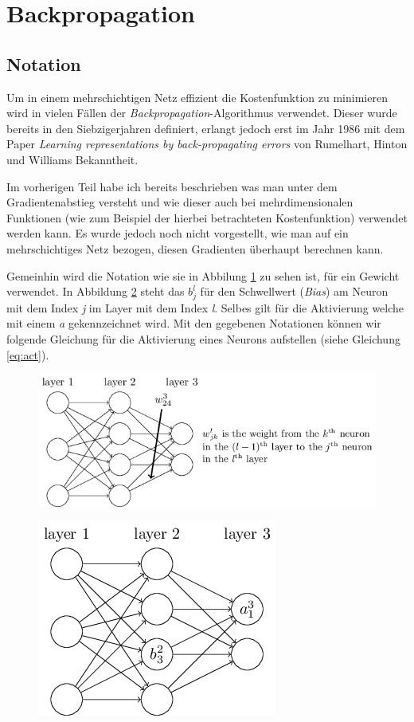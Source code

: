 \section{Backpropagation}

\subsection{Notation}

Um in einem mehrschichtigen Netz effizient die Kostenfunktion zu minimieren wird in vielen Fällen der \emph{Backpropagation}-Algorithmus verwendet. Dieser wurde bereits in den Siebzigerjahren definiert, erlangt jedoch erst im Jahr 1986 mit dem Paper \emph{Learning representations by back-propagating errors} von Rumelhart, Hinton und Williams Bekanntheit. 

Im vorherigen Teil habe ich bereits beschrieben was man unter dem Gradientenabstieg versteht und wie dieser auch bei mehrdimensionalen Funktionen (wie zum Beispiel der hierbei betrachteten Kostenfunktion) verwendet werden kann. Es wurde jedoch noch nicht vorgestellt, wie man auf ein mehrschichtiges Netz bezogen, diesen Gradienten überhaupt berechnen kann. 

Gemeinhin wird die Notation wie sie in Abbilung \ref{fig:weight_not} zu sehen ist, für ein Gewicht verwendet. In Abbildung \ref{fig:biasAct_not} steht das $b^l_j$ für den Schwellwert (\emph{Bias}) am Neuron mit dem Index \emph{j} im Layer mit dem Index \emph{l}. Selbes gilt für die Aktivierung welche mit einem \emph{a} gekennzeichnet wird. Mit den gegebenen Notationen können wir folgende Gleichung für die Aktivierung eines Neurons aufstellen (siehe Gleichung \ref{eq:act}). 

\begin{figure}[!htb]
	\centering
	\includegraphics[width=.9\linewidth]{img/weight_notation}
	\label{fig:weight_not}
\end{figure}

\begin{figure}[!htb]
	\centering
	\includegraphics[width=.4\linewidth]{img/biasAct_notation}
	\label{fig:biasAct_not}
\end{figure}

